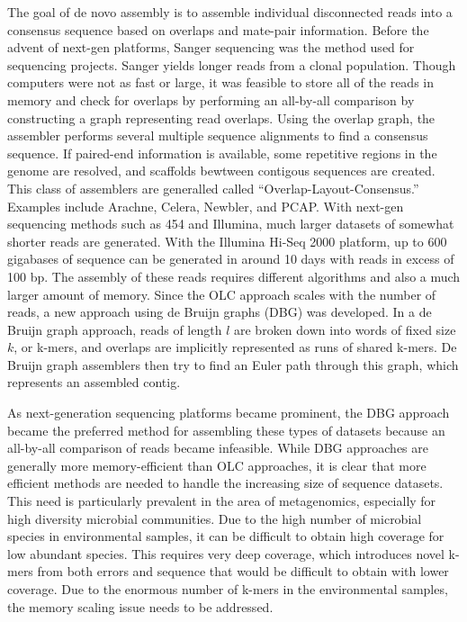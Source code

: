\documentclass[12pt]{article} \usepackage{simplemargins}
\begin{document}
The goal of de novo assembly is to assemble individual disconnected
reads into a consensus sequence based on overlaps and mate-pair
information. Before the advent of next-gen platforms, Sanger
sequencing was the method used for sequencing projects.  Sanger yields
longer reads from a clonal population.  Though
computers were not as fast or large, it was feasible to
store all of the reads in memory and check for overlaps by performing
an all-by-all comparison\cite{assemblyreview} by constructing a graph 
representing read overlaps. Using the overlap graph, the assembler 
performs several multiple sequence alignments to find a consensus sequence. 
If paired-end information is available, some repetitive regions in the 
genome are resolved, and scaffolds bewtween contigous sequences are 
created. This class of assemblers are generalled called 
``Overlap-Layout-Consensus.'' Examples include
Arachne\cite{arachne}, Celera\cite{celera}, Newbler\cite{newbler}, and 
PCAP\cite{pcap}. With next-gen sequencing 
methods such as 454 and Illumina, much larger datasets of somewhat shorter reads 
are generated. With the Illumina Hi-Seq 2000 platform, up to 600 
gigabases of sequence can be generated 
in around 10 days with reads in excess of 100 bp. The assembly of 
these reads requires different
algorithms and also a much larger amount of memory. Since the OLC
approach scales with the number of reads, a new approach using de Bruijn 
graphs (DBG) was developed\cite{pmid11504945}.
In a de Bruijn
graph approach, reads of length $l$ are broken down into words of fixed
size $k$, or k-mers, and overlaps are implicitly represented as runs of shared k-mers.
De Bruijn graph assemblers then try to find an Euler path through
this graph, which represents an assembled contig\cite{assemblyreview}. 

As next-generation sequencing platforms became prominent, the DBG approach
became the preferred method for assembling these types of datasets
because an all-by-all comparison of reads became infeasible. While DBG
approaches are generally more memory-efficient than OLC approaches, it
is clear that more efficient methods are needed to handle the
increasing size of sequence datasets. This need is particularly
prevalent in the area of metagenomics, especially for high diversity
microbial communities. Due to the high number of microbial species 
in environmental samples, it can be difficult to obtain high coverage 
for low abundant species. This 
requires very deep coverage, which introduces novel k-mers from both 
errors and sequence that 
would be difficult to obtain with lower coverage. Due to the enormous 
number of k-mers in the 
environmental samples, the memory scaling issue needs to be addressed.
\end{document}
